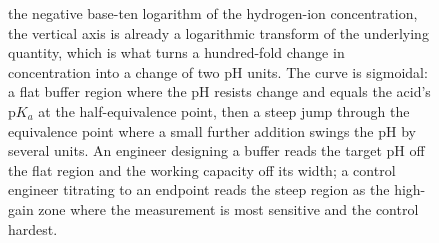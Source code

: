 \begin{figure}[htbp]
{the negative base-ten logarithm of the hydrogen-ion concentration, the
vertical axis is already a logarithmic transform of the underlying
quantity, which is what turns a hundred-fold change in concentration
into a change of two pH units. The curve is sigmoidal: a flat buffer
region where the pH resists change and equals the acid's $\mathrm{p}K_a$
at the half-equivalence point, then a steep jump through the
equivalence point where a small further addition swings the pH by
several units. An engineer designing a buffer reads the target pH off
the flat region and the working capacity off its width; a control
engineer titrating to an endpoint reads the steep region as the
high-gain zone where the measurement is most sensitive and the control
hardest.}
\label{fig:vol02:ch02:titration-curve}
\end{figure}
